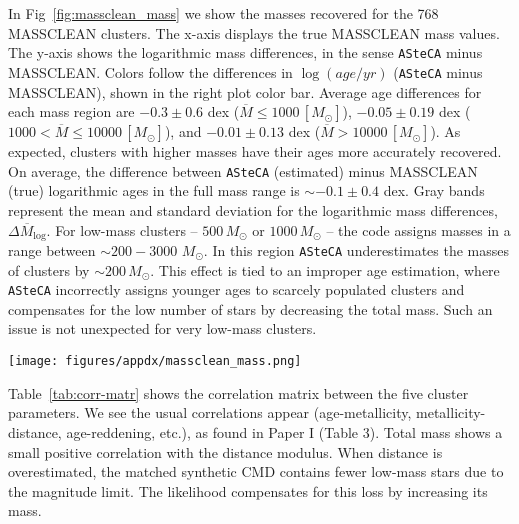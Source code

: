 \documentclass[draft]{aa}
\renewcommand{\includegraphics}[2][]{}
\begin{document}
\begin{appendix}
In Fig~\ref{fig:massclean_mass} we show the masses recovered for the 768
MASSCLEAN clusters. The x-axis displays the true MASSCLEAN mass
values. The y-axis shows the logarithmic mass differences, in the sense \texttt
{ASteCA} minus MASSCLEAN.\@
%
Colors follow the differences in $\log(age/yr)$ (\texttt{ASteCA} minus
MASSCLEAN), shown in the right plot color bar.
Average age differences for each mass region are 
$-0.3{\pm}0.6$ dex ($\overline{M}{\le}1000\,[M_{\odot}]$),
$-0.05{\pm}0.19$ dex ($1000{<}\overline{M}{\le}10000\,[M_{\odot}]$), and
$-0.01{\pm}0.13$ dex ($\overline{M}{>}10000\,[M_{\odot}]$).
As expected, clusters with higher masses have their ages more accurately
recovered. On average, the difference between \texttt{ASteCA} (estimated) minus
MASSCLEAN (true) logarithmic ages in the full mass range is ${\sim}-0.1{\pm}0.4$
dex.
%
Gray bands represent the mean and standard deviation for the logarithmic
mass differences, $\overline{\Delta M_{\log}}$.
%
For low-mass clusters -- $500\,M_{\odot}$ or $1000\,M_{\odot}$ -- the
code assigns masses in a range between ${\sim}200{-}3000$ $M_{\odot}$.
In this region \texttt{ASteCA} underestimates the masses of clusters by
${\sim}200\,M_{\odot}$. This effect is tied to an improper age estimation, where
\texttt{ASteCA} incorrectly assigns younger ages to scarcely populated clusters
and compensates for the low number of stars by decreasing the total mass. Such an
issue is not unexpected for very low-mass clusters.

\begin{figure*}
\texttt{[image: figures/appdx/massclean\_mass.png]}
\caption{Recovered masses by \texttt{ASteCA} for the 768 MASSCLEAN clusters.
Logarithmic mass differences $\Delta M_{\log}$ are obtained in the sense
\texttt{ASteCA} minus MASSCLEAN and shown in the y-axis. MASSCLEAN masses in
the x-axis are perturbed with a small random scatter.}
\label{fig:massclean_mass}
\end{figure*}

Table~\ref{tab:corr-matr} shows the correlation matrix between the five cluster
parameters. We see the usual correlations appear (age-metallicity,
metallicity-distance, age-reddening, etc.), as found in Paper I (Table 3).
Total mass shows a small positive correlation with the distance modulus.
When distance is overestimated, the matched synthetic CMD contains fewer
low-mass stars due to the magnitude limit. The likelihood compensates for this
loss by increasing its mass.


\end{appendix}
\end{document}
